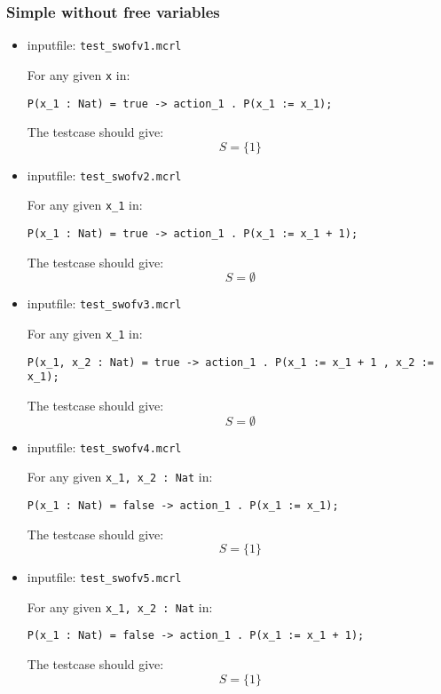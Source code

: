 \documentclass[a4paper,10pt]{article}
\begin{document}
\subsubsection{Simple without free variables}
\begin{itemize}

\item inputfile: \verb"test_swofv1.mcrl" 
\begin{tcase}
For any given \verb"x" in:
\begin{verbatim}
P(x_1 : Nat) = true -> action_1 . P(x_1 := x_1);
\end{verbatim}
The testcase should give:
$$ S = \lbrace 1 \rbrace $$
\end{tcase}

\item inputfile: \verb"test_swofv2.mcrl" 
\begin{tcase} 
For any given \verb"x_1" in:
\begin{verbatim}
P(x_1 : Nat) = true -> action_1 . P(x_1 := x_1 + 1);
\end{verbatim}
The testcase should give:
$$ S = \emptyset $$
\end{tcase}

\item inputfile: \verb"test_swofv3.mcrl" 
\begin{tcase}
For any given \verb"x_1" in:
\begin{verbatim}
P(x_1, x_2 : Nat) = true -> action_1 . P(x_1 := x_1 + 1 , x_2 := x_1);
\end{verbatim}
The testcase should give:
$$ S = \emptyset $$
\end{tcase}

\item inputfile: \verb"test_swofv4.mcrl" 
\begin{tcase}
For any given \verb"x_1, x_2 : Nat" in:
\begin{verbatim}
P(x_1 : Nat) = false -> action_1 . P(x_1 := x_1);
\end{verbatim}
The testcase should give:
$$ S = \lbrace 1 \rbrace $$
\end{tcase}

\item inputfile: \verb"test_swofv5.mcrl" 
\begin{tcase}
For any given \verb"x_1, x_2 : Nat" in:
\begin{verbatim}
P(x_1 : Nat) = false -> action_1 . P(x_1 := x_1 + 1);
\end{verbatim}
The testcase should give:
$$ S = \lbrace 1 \rbrace  $$
\end{tcase}


\end{itemize}
\end{document}
